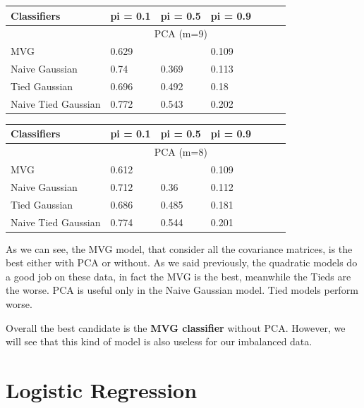 \documentclass[english]{report}
\begin{document}
\begin{table}[H]
    \centering
    \begin{tabular}{@{}lllllll@{}}
    \toprule
    Classifiers         & pi = 0.1 & pi = 0.5 & pi = 0.9 \\ \midrule
                        & \multicolumn{3}{c}{PCA (m=9)}  \\ \midrule
    MVG                 & 0.629    & \color{red}{0.33}    & 0.109    \\
    Naive Gaussian      & 0.74    & 0.369    & 0.113    \\
    Tied Gaussian       & 0.696    & 0.492    & 0.18    \\
    Naive Tied Gaussian & 0.772    & 0.543    & 0.202    \\ \bottomrule
    \end{tabular}
    \label{tab:MVG_PCA9_valid}
\end{table}

\begin{table}[H]
    \centering
    \begin{tabular}{@{}lllllll@{}}
    \toprule
    Classifiers         & pi = 0.1 & pi = 0.5 & pi = 0.9 \\ \midrule
                        & \multicolumn{3}{c}{PCA (m=8)}  \\ \midrule
    MVG                 & 0.612    & \color{red}{0.333}    & 0.109    \\
    Naive Gaussian      & 0.712     & 0.36    & 0.112    \\
    Tied Gaussian       & 0.686    & 0.485    & 0.181    \\
    Naive Tied Gaussian & 0.774    & 0.544    & 0.201    \\ \bottomrule
    \end{tabular}
    \label{tab:MVG_PCA8_valid}
\end{table}

As we can see, the MVG model, that consider all the covariance matrices, is the best either with PCA or without. As we said previously, 
the quadratic models do a good job on these data, in fact the MVG is the best, meanwhile the Tieds are the worse.
PCA is useful only in the Naive Gaussian model.
Tied models perform worse.

Overall the best candidate is the \textbf{MVG classifier} without PCA. However, we will see that this kind of model is also
useless for our imbalanced data.

\clearpage

\section{Logistic Regression}
\end{document}
